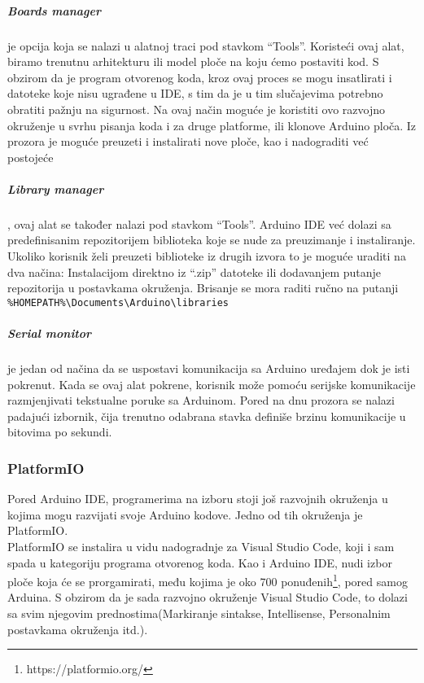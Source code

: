 \documentclass[../Document.tex]{subfiles}
\begin{document}
\subparagraph{Boards manager} je opcija koja se nalazi u alatnoj traci pod stavkom ``Tools''. Koristeći ovaj alat, biramo trenutnu arhitekturu ili model ploče na koju ćemo postaviti kod. S obzirom da je program otvorenog koda, kroz ovaj proces se mogu insatlirati i datoteke koje nisu ugrađene u IDE, s tim da je u tim slučajevima potrebno obratiti pažnju na sigurnost. Na ovaj način moguće je koristiti ovo razvojno okruženje u svrhu pisanja koda i za druge platforme, ili klonove Arduino ploča. Iz prozora je moguće preuzeti i instalirati nove ploče, kao i nadograditi već postojeće


\subparagraph{Library manager}, ovaj alat se također nalazi pod stavkom ``Tools''. Arduino IDE već dolazi sa predefinisanim repozitorijem biblioteka koje se nude za preuzimanje i instaliranje. Ukoliko korisnik želi preuzeti biblioteke iz drugih izvora to je moguće uraditi na dva načina: Instalacijom direktno iz ``.zip'' datoteke ili dodavanjem putanje repozitorija u postavkama okruženja. Brisanje se mora raditi ručno na putanji \verb|%HOMEPATH%\Documents\Arduino\libraries|


\subparagraph{Serial monitor} je jedan od načina da se uspostavi komunikacija sa Arduino uređajem dok je isti pokrenut. Kada se ovaj alat pokrene, korisnik može pomoću serijske komunikacije razmjenjivati tekstualne poruke sa Arduinom. Pored na dnu prozora se nalazi padajući izbornik, čija trenutno odabrana stavka definiše brzinu komunikacije u bitovima po sekundi.


\subsubsection{PlatformIO}

Pored Arduino IDE, programerima na izboru stoji još razvojnih okruženja u kojima mogu razvijati svoje Arduino kodove. Jedno od tih okruženja je PlatformIO.\\

PlatformIO se instalira u vidu nadogradnje za Visual Studio Code, koji i sam spada u kategoriju programa otvorenog koda. Kao i Arduino IDE, nudi izbor ploče koja će se prorgamirati, među kojima je oko 700 ponuđenih\footnote{https://platformio.org/}, pored samog Arduina. S obzirom da je sada razvojno okruženje Visual Studio Code, to dolazi sa svim njegovim prednostima(Markiranje sintakse, Intellisense, Personalnim postavkama okruženja itd.).\\
\end{document}
